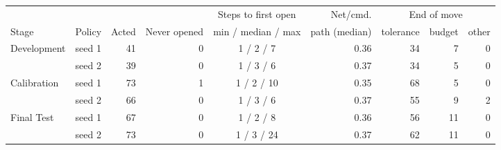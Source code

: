 \begin{tabular}{llrrcrrrr}
\toprule
 & & & & Steps to first open & Net/cmd. & \multicolumn{3}{c}{End of move}\\
\cmidrule(lr){7-9}
Stage & Policy & Acted & Never opened & min / median / max & path (median) & tolerance & budget & other\\
\midrule
Development & seed 1 & 41 & 0 & 1 / 2 / 7 & 0.36 & 34 & 7 & 0\\
 & seed 2 & 39 & 0 & 1 / 3 / 6 & 0.37 & 34 & 5 & 0\\
Calibration & seed 1 & 73 & 1 & 1 / 2 / 10 & 0.35 & 68 & 5 & 0\\
 & seed 2 & 66 & 0 & 1 / 3 / 6 & 0.37 & 55 & 9 & 2\\
Final Test & seed 1 & 67 & 0 & 1 / 2 / 8 & 0.36 & 56 & 11 & 0\\
 & seed 2 & 73 & 0 & 1 / 3 / 24 & 0.37 & 62 & 11 & 0\\
\bottomrule
\end{tabular}

